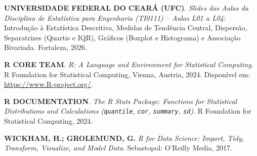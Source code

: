 \documentclass[10pt,a4paper]{article}
\begin{document}
\begin{enumerate}[label={[\arabic*]}, leftmargin=*, itemsep=8pt]
    \item \textbf{UNIVERSIDADE FEDERAL DO CEARÁ (UFC)}. \textit{Slides das Aulas da Disciplina de Estatística para Engenharia (TI0111) -- Aulas L01 a L04}: Introdução à Estatística Descritiva, Medidas de Tendência Central, Dispersão, Separatrizes (Quartis e IQR), Gráficos (Boxplot e Histograma) e Associação Bivariada. Fortaleza, 2026.
    
    \item \textbf{R CORE TEAM}. \textit{R: A Language and Environment for Statistical Computing}. R Foundation for Statistical Computing, Vienna, Austria, 2024. Disponível em: \url{https://www.R-project.org/}.
    
    \item \textbf{R DOCUMENTATION}. \textit{The R Stats Package: Functions for Statistical Distributions and Calculations (\texttt{quantile}, \texttt{cor}, \texttt{summary}, \texttt{sd})}. R Foundation for Statistical Computing, 2024.
    
    \item \textbf{WICKHAM, H.; GROLEMUND, G.} \textit{R for Data Science: Import, Tidy, Transform, Visualize, and Model Data}. Sebastopol: O'Reilly Media, 2017.
\end{enumerate}
\end{document}
